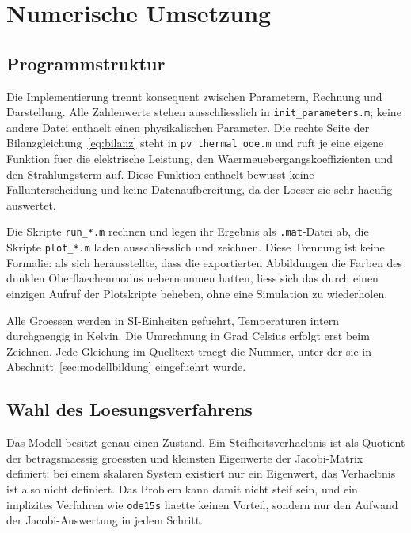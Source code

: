 \section{Numerische Umsetzung}
\label{sec:numerik}


\subsection{Programmstruktur}

Die Implementierung trennt konsequent zwischen Parametern, Rechnung und
Darstellung. Alle Zahlenwerte stehen ausschliesslich in
\texttt{init\_parameters.m}; keine andere Datei enthaelt einen physikalischen
Parameter. Die rechte Seite der Bilanzgleichung~\eqref{eq:bilanz} steht in
\texttt{pv\_thermal\_ode.m} und ruft je eine eigene Funktion fuer die
elektrische Leistung, den Waermeuebergangskoeffizienten und den
Strahlungsterm auf. Diese Funktion enthaelt bewusst keine Fallunterscheidung
und keine Datenaufbereitung, da der Loeser sie sehr haeufig auswertet.

Die Skripte \texttt{run\_*.m} rechnen und legen ihr Ergebnis als
\texttt{.mat}-Datei ab, die Skripte \texttt{plot\_*.m} laden ausschliesslich
und zeichnen. Diese Trennung ist keine Formalie: als sich herausstellte, dass
die exportierten Abbildungen die Farben des dunklen Oberflaechenmodus
uebernommen hatten, liess sich das durch einen einzigen Aufruf der
Plotskripte beheben, ohne eine Simulation zu wiederholen.

Alle Groessen werden in SI-Einheiten gefuehrt, Temperaturen intern
durchgaengig in Kelvin. Die Umrechnung in Grad Celsius erfolgt erst beim
Zeichnen. Jede Gleichung im Quelltext traegt die Nummer, unter der sie in
Abschnitt~\ref{sec:modellbildung} eingefuehrt wurde.

\subsection{Wahl des Loesungsverfahrens}
\label{sec:solver}

Das Modell besitzt genau einen Zustand. Ein Steifheitsverhaeltnis ist als
Quotient der betragsmaessig groessten und kleinsten Eigenwerte der
Jacobi-Matrix definiert; bei einem skalaren System existiert nur ein
Eigenwert, das Verhaeltnis ist also nicht definiert. Das Problem kann damit
nicht steif sein, und ein implizites Verfahren wie \texttt{ode15s} haette
keinen Vorteil, sondern nur den Aufwand der Jacobi-Auswertung in jedem
Schritt.

